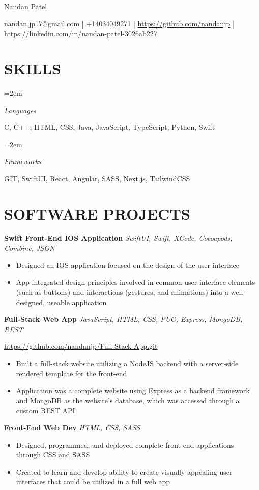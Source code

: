 \documentclass[fontsize=11pt]{article}
\newlength{\spacebox}
\newcommand{\MyName}[1]{ %
    \Huge \usefont{OT1}{phv}{b}{n} \hfill #1
    \par \normalsize \normalfont}
\newcommand{\NewPart}[1]{\section*{\uppercase{#1}}}
\newcommand{\PersonalEntry}[2]{
    \noindent\hangindent=2em\hangafter=0 %
    \parbox{\spacebox}{                  %
    \textit{#1}}                      %
    \hspace{1.5em} #2 \par}              %
\newcommand{\SkillsEntry}[2]{                %
    \noindent\hangindent=2em\hangafter=0 %
    \parbox{\spacebox}{                  %
    \textit{#1}}                    %
    \hspace{1.5em} #2 \par}              %
\newcommand{\EducationEntry}[4]{
    \noindent \textbf{#1} \hfill      %
    \colorbox{Black}{
      \parbox{8.5em}{
      \hfill\color{White}#2}} \par  %
    \noindent \textit{#3} \par        %
    \noindent\hangindent=2em\hangafter=0 \small #4 %
    \normalsize \par}
\newcommand{\ProjectEntry}[4]{         %
    \noindent \textbf{#1} \noindent \textit{#3} \hfill {#2} \par
    \noindent \small #4 %
    \normalsize \par}
\begin{document}
    
\MyName{Nandan Patel}
\bigskip
{\small \hfill nandan.jp17@gmail.com | +14034049271 | \underline{\color{blue}https://github.com/nandanjp} | \underline{\color{blue}https://linkedin.com/in/nandan-patel-3026ab227}

\NewPart{Skills}{}
\SkillsEntry{Languages}{C, C++, HTML, CSS, Java, JavaScript, TypeScript, Python, Swift}
\SkillsEntry{Frameworks} {GIT, SwiftUI, React, Angular, SASS, Next.js, TailwindCSS}
\NewPart{Software Projects}{}

\ProjectEntry{Swift Front-End IOS Application}{}
{SwiftUI, Swift, XCode, Cocoapods, Combine, JSON}
{\begin{itemize} \itemsep -1pt
    \item Designed an IOS application focused on the design of the user interface
    \item App integrated design principles involved in common user interface elements (such as buttons) and interactions (gestures, and animations) into a well-designed, useable application
    \end{itemize}
}
\ProjectEntry{Full-Stack Web App}{}
{JavaScript, HTML, CSS, PUG, Express, MongoDB, REST}
{\underline{\color{blue}https://github.com/nandanjp/Full-Stack-App.git}}
{\begin{itemize} \itemsep -1pt
    \item Built a full-stack website utilizing a NodeJS backend with a server-side rendered template for the front-end
    \item Application was a complete website using Express as a backend framework and MongoDB as the website's database, which was accessed through a custom REST API
    \end{itemize}
}
\ProjectEntry{Front-End Web Dev}{}
{HTML, CSS, SASS}
{\underline{\color{blue}{https://github.com/nandanjp/CSS-Flexbox.git}}}
{\begin{itemize} \itemsep -1pt
    \item Designed, programmed, and deployed complete front-end applications through CSS and SASS
    \item Created to learn and develop ability to create visually appealing user interfaces that could be utilized in a full web app
    \end{itemize}
}

}
\end{document}
